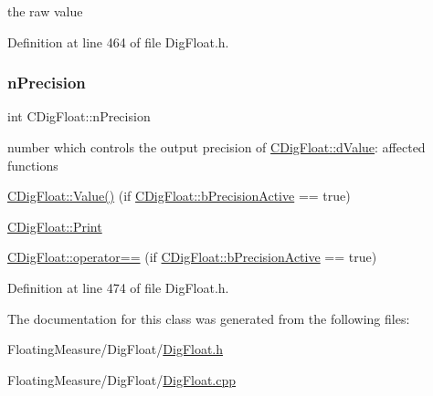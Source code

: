 the raw value 



Definition at line 464 of file Dig\+Float.\+h.

\mbox{\label{classCDigFloat_ad580654be35246d14c91482581c0bc11}} 
\subsubsection{\texorpdfstring{n\+Precision}{nPrecision}}
{\footnotesize\ttfamily int C\+Dig\+Float\+::n\+Precision\hspace{0.3cm}{\ttfamily [protected]}}



number which controls the output precision of \hyperlink{classCDigFloat_a4bbe69e30dd4e20527362493aa9aaf96}{C\+Dig\+Float\+::d\+Value}\+: affected functions 


\begin{DoxyItemize}
\item \hyperlink{classCDigFloat_af74b8cd0935294b6371f551b7a1ff640}{C\+Dig\+Float\+::\+Value()} (if \hyperlink{classCDigFloat_aa1f6ed0312a2aa6ae5ee2abd195adefc}{C\+Dig\+Float\+::b\+Precision\+Active} == true)
\item \hyperlink{classCDigFloat_a80731e0970f607114d6d1bde4d02bd39}{C\+Dig\+Float\+::\+Print}
\item \hyperlink{classCDigFloat_ad8980d984bf2bab71d15b830fd0180a5}{C\+Dig\+Float\+::operator==} (if \hyperlink{classCDigFloat_aa1f6ed0312a2aa6ae5ee2abd195adefc}{C\+Dig\+Float\+::b\+Precision\+Active} == true) 
\end{DoxyItemize}

Definition at line 474 of file Dig\+Float.\+h.



The documentation for this class was generated from the following files\+:\begin{DoxyCompactItemize}
\item 
Floating\+Measure/\+Dig\+Float/\hyperlink{DigFloat_8h}{Dig\+Float.\+h}\item 
Floating\+Measure/\+Dig\+Float/\hyperlink{DigFloat_8cpp}{Dig\+Float.\+cpp}\end{DoxyCompactItemize}
